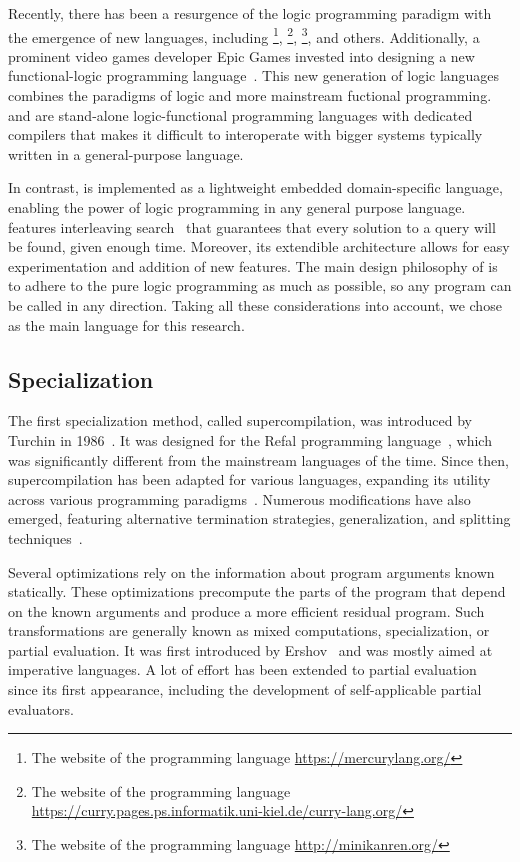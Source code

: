 Recently, there has been a resurgence of the logic programming paradigm with the emergence of new languages, including \merc\footnote{The website of the \merc programming language \url{https://mercurylang.org/}}, \curry\footnote{The website of the \curry programming language \url{https://curry.pages.ps.informatik.uni-kiel.de/curry-lang.org/}}, \mk\footnote{The website of the \mk programming language \url{http://minikanren.org/}}, and others.
Additionally, a prominent video games developer Epic Games invested into designing a new functional-logic programming language~\cite{versecalculus}.
This new generation of logic languages combines the paradigms of logic and more mainstream fuctional programming. 
\merc and \curry are stand-alone logic-functional programming languages with dedicated compilers that makes it difficult to interoperate with bigger systems typically written in a general-purpose language. 

In contrast, \mk is implemented as a lightweight embedded domain-specific language, enabling the power of logic programming in any general purpose language. 
\mk features interleaving search~\cite{kiselyov2005backtracking} that guarantees that every solution to a query will be found, given enough time. 
Moreover, its extendible architecture allows for easy experimentation and addition of new features. 
The main design philosophy of \mk is to adhere to the pure logic programming as much as possible, so any program can be called in any direction. 
Taking all these considerations into account, we chose \mk as the main language for this research. 

\subsection{Specialization}

The first specialization method, called supercompilation, was introduced by Turchin in 1986~\cite{turchin1986concept}.
It was designed for the Refal programming language~\cite{turchin1989refal}, which was significantly different from the mainstream languages of the time.
Since then, supercompilation has been adapted for various languages, expanding its utility across various programming paradigms~\cite{klyuchnikov2009supercompiler,mitchell2010rethinking}.
Numerous modifications have also emerged, featuring alternative termination strategies, generalization, and splitting techniques~\cite{leuschel2002homeomorphic,sorensen1995algorithm,turchin1988algorithm}. 

Several optimizations rely on the information about program arguments known statically. 
These optimizations precompute the parts of the program that depend on the known arguments and produce a more efficient residual program. 
Such transformations are generally known as mixed computations, specialization, or partial evaluation. 
It was first introduced by Ershov~\cite{ERSHOV198241} and was mostly aimed at imperative languages. 
A lot of effort has been extended to partial evaluation~\cite{jones1993partial,intro2partialEvaluation} since its first appearance, including the development of self-applicable partial evaluators. 

